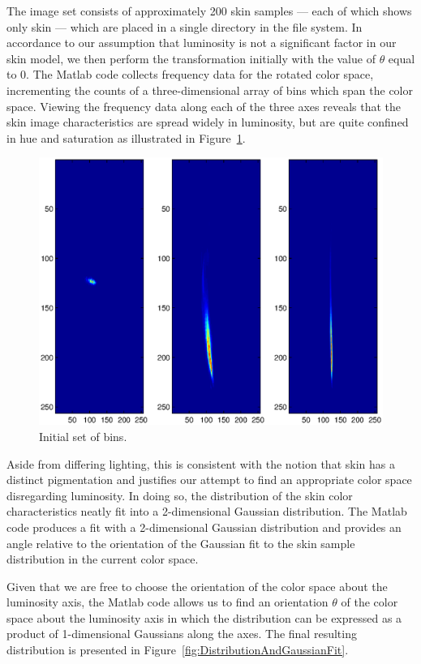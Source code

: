 The image set consists of approximately 200 skin samples --- each of which shows only skin --- which are placed in a single directory in the file system. In accordance to our assumption that luminosity is not a significant factor in our skin model, we then perform the transformation initially with the value of $\theta$ equal to 0. The Matlab code collects frequency data for the rotated color space, incrementing the counts of a three-dimensional array of bins which span the color space. Viewing the frequency data along each of the three axes reveals that the skin image characteristics are spread widely in luminosity, but are quite confined in hue and saturation as illustrated in Figure~\ref{fig:InitBins}.


\begin{figure}[h!]
  \caption{Initial set of bins.}\label{fig:InitBins}
  \centering
    \includegraphics[width=\textwidth]{Chapter2/Figs/InitialBins.eps}
\end{figure}


Aside from differing lighting, this is consistent with the notion that skin has a distinct pigmentation and justifies our attempt to find an appropriate color space disregarding luminosity. In doing so, the distribution of the skin color characteristics neatly fit into a 2-dimensional Gaussian distribution. The Matlab code produces a fit with a 2-dimensional Gaussian distribution and provides an angle relative to the orientation of the Gaussian fit to the skin sample distribution in the current color space. 

Given that we are free to choose the orientation of the color space about the luminosity axis, the Matlab code allows us to find an orientation $\theta$ of the color space about the luminosity axis in which the distribution can be expressed as a product of 1-dimensional Gaussians along the axes. The final resulting distribution is presented in Figure~\ref{fig:DistributionAndGaussianFit}.


